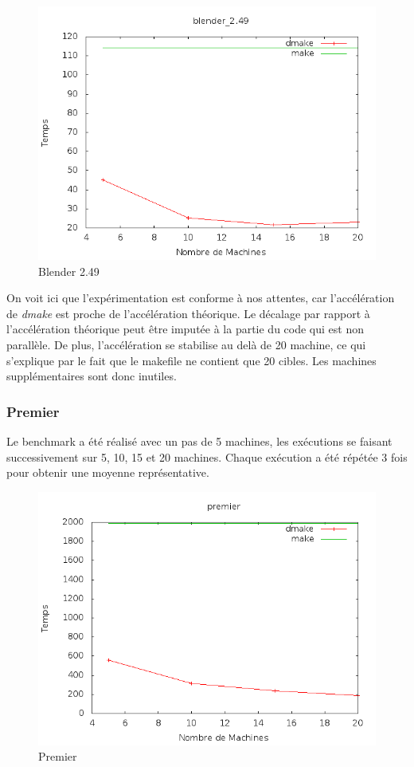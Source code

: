 \documentclass[a4paper,12pt,twoside]{article}
\begin{document}
\begin{figure}[H]
  \centering
  \includegraphics[scale=0.5]{benchmark_blender_2_49_01.png}
  \caption{Blender 2.49}
  \label{fig:blender249}
\end{figure}

On voit ici que l'expérimentation est conforme à nos attentes, car
l'accélération de \emph{dmake} est proche de l'accélération
théorique. Le décalage par rapport à l'accélération théorique peut
être imputée à la partie du code qui est non parallèle. De plus,
l'accélération se stabilise au delà de 20 machine, ce qui s'explique
par le fait que le makefile ne contient que 20 cibles. Les machines
supplémentaires sont donc inutiles. 

\subsubsection{Premier}

Le benchmark a été réalisé avec un pas de 5 machines, les exécutions
se faisant successivement sur 5, 10, 15 et 20 machines. Chaque
exécution a été répétée 3 fois pour obtenir une moyenne
représentative.

\begin{figure}[H]
  \centering
  \includegraphics[scale=0.5]{benchmark_premier_01.png}
  \caption{Premier}
  \label{fig:premier}
\end{figure}
\end{document}

